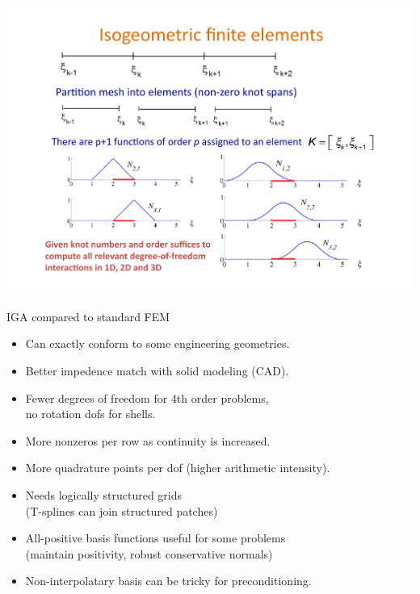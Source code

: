 \begin{frame}
  \centering
  \includegraphics[width=1.1\textwidth]{figures/IGACalo}
\end{frame}

\begin{frame}{IGA compared to standard FEM}
  \begin{itemize}
  \item Can exactly conform to some engineering geometries.
  \item Better impedence match with solid modeling (CAD).
  \item Fewer degrees of freedom for 4th order problems,\\
    \quad \eg no rotation dofs for shells.
  \item More nonzeros per row as continuity is increased.
  \item More quadrature points per dof (higher arithmetic intensity).
  \item Needs logically structured grids \\
    (T-splines can join structured patches)
  \item All-positive basis functions useful for some problems \\
    (maintain positivity, robust conservative normals)
  \item Non-interpolatary basis can be tricky for preconditioning.
  \end{itemize}
\end{frame}

